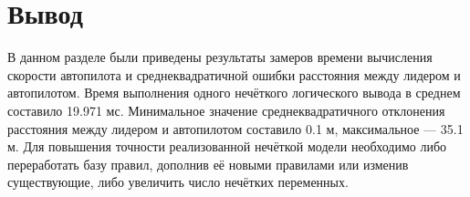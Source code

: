 \section*{Вывод}

В данном разделе были приведены результаты замеров времени вычисления скорости автопилота и среднеквадратичной ошибки расстояния между лидером и автопилотом. Время выполнения одного нечёткого логического вывода в среднем составило 19.971 мс. Минимальное значение среднеквадратичного отклонения расстояния между лидером и автопилотом составило 0.1 м, максимальное --- 35.1 м. Для повышения точности реализованной нечёткой модели необходимо либо переработать базу правил, дополнив её новыми правилами или изменив существующие, либо увеличить число нечётких переменных.

\clearpage
